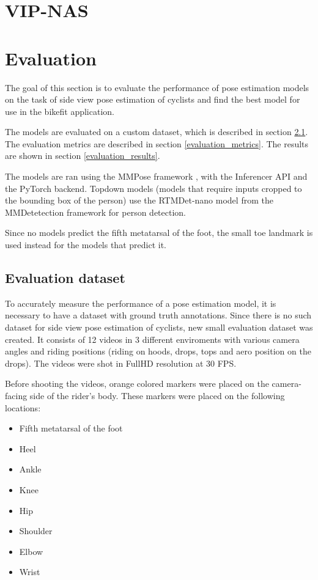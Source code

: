 \section{VIP-NAS}

\section{Evaluation}
The goal of this section is to evaluate the performance of pose estimation models on the task of side view pose estimation of cyclists and find the best model for use in the bikefit application.

The models are evaluated on a custom dataset, which is described in section \ref{evaluation_dataset}. The evaluation metrics are described in section \ref{evaluation_metrics}. The results are shown in section \ref{evaluation_results}.

The models are ran using the MMPose framework \cite{mmpose2020}, with the Inferencer API and the PyTorch backend. Topdown models (models that require inputs cropped to the bounding box of the person) use the RTMDet-nano model \cite{rtmdet} from the MMDetetection framework \cite{mmdetection} for person detection.

Since no models predict the fifth metatarsal of the foot, the small toe landmark is used instead for the models that predict it.



\subsection{Evaluation dataset}
\label{evaluation_dataset}
To accurately measure the performance of a pose estimation model, it is necessary to have a dataset with ground truth annotations. Since there is no such dataset for side view pose estimation of cyclists, new small evaluation dataset was created. It consists of 12 videos in 3 different enviroments with various camera angles and riding positions (riding on hoods, drops, tops and aero position on the drops). The videos were shot in FullHD resolution at 30 FPS.

Before shooting the videos, orange colored markers were placed on the camera-facing side of the rider's body. These markers were placed on the following locations:

\begin{itemize}
    \item Fifth metatarsal of the foot
    \item Heel
    \item Ankle
    \item Knee
    \item Hip
    \item Shoulder
    \item Elbow
    \item Wrist
\end{itemize}

